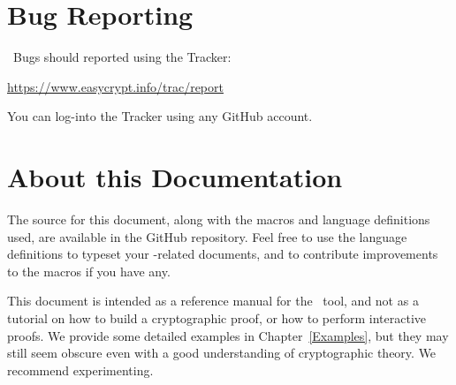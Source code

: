 \section{Bug Reporting}

\EasyCrypt\ Bugs should reported using the Tracker:
\begin{center}
  \url{https://www.easycrypt.info/trac/report}
\end{center}
You can log-into the Tracker using any GitHub account.

\section{About this Documentation}

The source for this document, along with the macros and language
definitions used, are available in the GitHub repository. Feel free to
use the language definitions to typeset your \EasyCrypt-related
documents, and to contribute improvements to the macros if you have
any.

This document is intended as a reference manual for the \EasyCrypt\
tool, and not as a tutorial on how to build a cryptographic proof, or
how to perform interactive proofs. We provide some detailed examples
in Chapter~\ref{Examples}, but they may still seem obscure
even with a good understanding of cryptographic theory. We recommend
experimenting.
